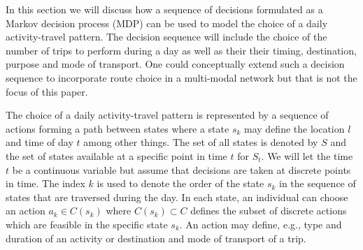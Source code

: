 \label{seq:mdp}
In this section we will discuss how a sequence of decisions formulated as a Markov decision process (MDP) can be used to model the choice of a daily activity-travel pattern. The decision sequence will include the choice of the number of trips to perform during a day as well as their their timing, destination, purpose and mode of transport. One could conceptually extend such a decision sequence to incorporate route choice in a multi-modal network \citep[as in][]{arentze04Multistate} but that is not the focus of this paper.

% 


\newcommand{\bs}{\mathbf{s}}
\newcommand{\ba}{\mathbf{a}}
\newcommand{\avgu}{u}

The choice of a daily activity-travel pattern is represented by a sequence of actions forming a path between states where a state $s_k$ may define the location $l$ and time of day $t$ among other things. The set of all states is denoted by $S$ and the set of states available at a specific point in time $t$ for $S_t$. We will let the time $t$ be a continuous variable but assume that decisions are taken at discrete points in time. The index $k$ is used to denote the order of the state $s_k$ in the sequence of states that are traversed during the day. In each state, an individual can choose an action $a_k \in C(s_k)$ where $C(s_k) \subset C$ defines the subset of discrete actions which are feasible in the specific state $s_k$. An action may define, e.g., type and duration of an activity or destination and mode of transport of a trip. 

